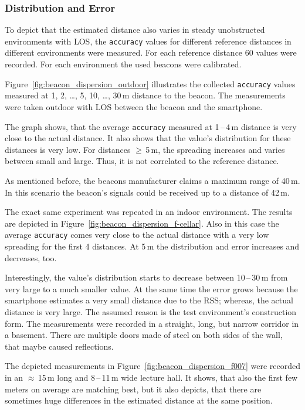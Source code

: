 \subsubsection*{Distribution and Error}
To depict that the estimated distance also varies in steady unobstructed environments with \acs{LOS}, the \texttt{accuracy} values for different reference distances in different environments were measured. For each reference distance 60 values were recorded. For each environment the used beacons were calibrated.

Figure~\ref{fig:beacon_dispersion_outdoor} illustrates the collected \texttt{accuracy} values measured at 1, 2, \ldots, 5, 10, \ldots, 30\,m distance to the beacon. The measurements were taken outdoor with \acl{LOS} between the beacon and the smartphone.

The graph shows, that the average \texttt{accuracy} measured at 1\,--\,4\,m distance is very close to the actual distance. It also shows that the value's distribution for these distances is very low. For distances $\geq$\,5\,m, the spreading increases and varies between small and large. Thus, it is not correlated to the reference distance.

As mentioned before, the beacons manufacturer claims a maximum range of 40\,m. In this scenario the beacon's signals could be received up to a distance of 42\,m.

The exact same experiment was repeated in an indoor environment. The results are depicted in Figure~\ref{fig:beacon_dispersion_f-cellar}. Also in this case the average \texttt{accuracy} comes very close to the actual distance with a very low spreading for the first 4 distances. At 5\,m the distribution and error increases and decreases, too.

Interestingly, the value's distribution starts to decrease between 10\,--\,30\,m from very large to a much smaller value. At the same time the error grows because the smartphone estimates a very small distance due to the \ac{RSS}; whereas, the actual distance is very large. The assumed reason is the test environment's construction form. The measurements were recorded in a straight, long, but narrow corridor in a basement. There are multiple doors made of steel on both sides of the wall, that maybe caused reflections.

The depicted measurements in Figure~\ref{fig:beacon_dispersion_f007} were recorded in an $\approx$\,15\,m long and 8\,--\,11\,m wide lecture hall. It shows, that also the first few meters on average are matching best, but it also depicts, that there are sometimes huge differences in the estimated distance at the same position.

